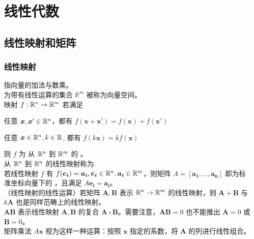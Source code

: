 \documentclass[./main.tex]{subfiles}
\begin{document}
\chapter{线性代数}

\section{线性映射和矩阵}

\subsection{线性映射}

指向量的加法与数乘。\\

为带有线性运算的集合 $\mathbb{R}^m$ 被称为向量空间。\\

映射 $f:\mathbb{R}^{n}\rightarrow\mathbb{R}^{m}$ 若满足
\begin{enumerate*}
    \item 任意 $\bm{x},\bm{x}'\in\mathbb{R}^{n}$，都有 $f(\bm{x}+\bm{x'})=f(\bm{x})+f(\bm{x'})$
    \item 任意 $\bm{x}\in\mathbb{R}^{n},k\in\mathbb{R}^{}$, 都有 $f(k\bm{x})=kf(\bm{x})$
\end{enumerate*}
则 $f$ 为 从 $\mathbb{R}^{n}$ 到 $\mathbb{R}^{m}$ 的 。\\

从 $\mathbb{R}^{n}$ 到 $\mathbb{R}^{n}$ 的线性映射称为.\\

若线性映射 $f$ 有 $f(\bm{e_i})=\bm{a_i},\bm{e_i}\in\mathbb{R}^{n}, \bm{a_i}\in\mathbb{R}^{m}$，则矩阵 $A=[\bm{a_1},\dots,\bm{a_n}]$ 即为标准坐标向量下的 ，且满足 $A\bm{e_i}=\bm{a_i}$。\\

（线性映射的线性运算）若矩阵 $\bm{A},\bm{B}$ 表示 $\mathbb{R}^{n}\rightarrow\mathbb{R}^{m}$ 的线性映射，则 $\bm{A}+\bm{B}$ 与 $k\bm{A}$ 也是同样范畴上的线性映射。\\

$\bm{AB}$ 表示线性映射 $\bm{A},\bm{B}$ 的复合 $\bm{A}\circ\bm{B}$。需要注意，$\bm{AB}=0$ 也不能推出 $\bm{A}=0$ 或 $\bm{B}=0$。\\

矩阵乘法 $A\bm{x}$ 视为这样一种运算：按照 $\bm{x}$ 指定的系数，将 $\bm{A}$ 的列进行线性组合。\\
\end{document}
